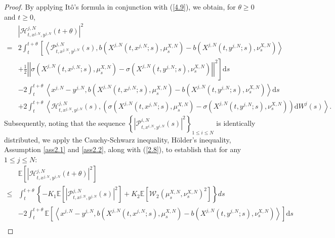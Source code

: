 \documentclass[12pt]{article}
\numberwithin{equation}{section}
\begin{document}
\begin{proof}
By applying It{\^o}'s formula in conjunction with (\ref{4.9}), we obtain, for $\theta \geq 0$ and $t \geq 0$,
\begin{equation}\tag{5.33}\label{4.16}
\begin{aligned}
&\left|\mathcal{H}^{j,N}_{t, x^{j,N}, y^{j,N}}\left(t+\theta\right)\right|^{2} \\= &2  \int_t^{t+\theta} \left[\left\langle\mathcal{P}^{j,N}_{t, x^{j,N}, y^{j,N}}\left(s\right), b\left(X^{j,N}\left(t, x^{j,N} ;s\right), \mu _{s}^{X,N}\right)-b\left(X^{j,N}\left(t, y^{j,N} ; s\right), \nu _{s}^{X,N}\right)\right\rangle\right. \\
 &+\left.\tfrac{1}{2}\left|\left|\sigma\left(X^{j,N}\left(t, x^{j,N} ;s\right), \mu _{s}^{X,N}\right)-\sigma\left(X^{j,N}\left(t, y^{j,N} ; s\right), \nu _{s}^{X,N}\right)\right|\right|^2\right] \mathrm{d} s \\
 &-2 \int_t^{t+\theta}\left\langle x^{j,N}-y^{j,N},b\left(X^{j,N}\left(t, x^{j,N} ;s\right), \mu _{s}^{X,N}\right)-b\left(X^{j,N}\left(t, y^{j,N} ; s\right), \nu _{s}^{X,N}\right)\right\rangle \mathrm{d} s \\
&+2 \int_t^{t+\theta}\left\langle\mathcal{H}^{j,N}_{t, x^{j,N}, y^{j,N}}\left(s\right),\left(\sigma\left(X^{j,N}\left(t, x^{j,N} ;s\right), \mu _{s}^{X,N}\right)-\sigma\left(X^{j,N}\left(t, y^{j,N} ; s\right), \nu _{s}^{X,N}\right)\right) \mathrm{d} W^{j}\left(s\right)\right\rangle.
\end{aligned}
\end{equation}
Subsequently, noting that the sequence $\left\{ \left|\mathcal{P} _{t,x^{i,N},y^{i,N}}^{i,N}\left( s\right) \right|^2 \right\} _{1 \leq i\leq N}$ is identically distributed, we apply the Cauchy-Schwarz inequality, H{\"o}lder's inequality, Assumption \ref{ass2.1} and \ref{ass2.2}, along with (\ref{2.8}), to establish that for any $1\leq j\leq N$:
\begin{equation}\tag{5.34}\label{4.17}
\begin{aligned}
&\mathbb{E} \left[ \left| \mathcal{H} _{t,x^{j,N},y^{j,N}}^{j,N}\left(t+\theta \right) \right|^2 \right]\\
\le &\int_t^{t+\theta}{\left\{ -K_1\mathbb{E} \left[ \left|\mathcal{P} _{t,x^{j,N},y^{j,N}}^{j,N}\left( s \right) \right|^2 \right] +K_2\mathbb{E} \left[\mathcal{W} _2\left( \mu _{s}^{X,N},\nu _{s}^{X,N} \right) ^2\right] \right\}}ds\\
&-2\int_t^{t+\theta}{\mathbb{E}\left[ \left\langle x^{j,N}-y^{j,N},b\left(X^{j,N}\left(t,x^{j,N};s\right),\mu _{s}^{X,N}\right)-b\left(X^{j,N}\left(t,y^{j,N};s\right),\nu _{s}^{X,N}\right)\right\rangle \right]} \mathrm{d}s\\

\end{aligned}
\end{equation}
\end{proof}
\end{document}
